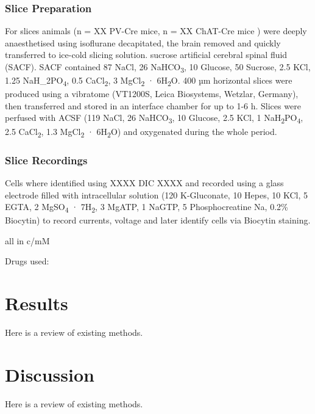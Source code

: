 \documentclass[
  12pt,
]{book}
\begin{document}
\hypertarget{slice-preparation}{%
\subsection{Slice Preparation}\label{slice-preparation}}

For slices animals (n = XX PV-Cre mice, n = XX ChAT-Cre mice ) were deeply anaesthetised using isoflurane decapitated, the brain removed and quickly transferred to ice-cold slicing solution. sucrose artificial cerebral spinal fluid (SACF). SACF contained 87 NaCl, 26 NaHCO\textsubscript{3}, 10 Glucose, 50 Sucrose, 2.5 KCl, 1.25 NaH\_2PO\textsubscript{4}, 0.5 CaCl\textsubscript{2}, 3 MgCl\textsubscript{2} · 6H\textsubscript{2}O.
400 µm horizontal slices were produced using a vibratome (VT1200S, Leica Biosystems, Wetzlar, Germany), then transferred and stored in an interface chamber for up to 1-6 h. Slices were perfused with ACSF (119 NaCl, 26 NaHCO\textsubscript{3}, 10 Glucose, 2.5 KCl, 1 NaH\textsubscript{2}PO\textsubscript{4}, 2.5 CaCl\textsubscript{2}, 1.3 MgCl\textsubscript{2} · 6H\textsubscript{2}O) and oxygenated during the whole period.

\hypertarget{slice-recordings}{%
\subsection{Slice Recordings}\label{slice-recordings}}

Cells where identified using XXXX DIC XXXX and recorded using a glass electrode filled with intracellular solution (120 K-Gluconate, 10 Hepes, 10 KCl, 5 EGTA, 2 MgSO\textsubscript{4} · 7H\textsubscript{2}, 3 MgATP, 1 NaGTP, 5 Phosphocreatine Na, 0.2\% Biocytin) to record currents, voltage and later identify cells via Biocytin staining.

all in c/mM

Drugs used:

\hypertarget{results}{%
\chapter{Results}\label{results}}

Here is a review of existing methods.

\hypertarget{discussion}{%
\chapter{Discussion}\label{discussion}}

Here is a review of existing methods.

  
\end{document}
